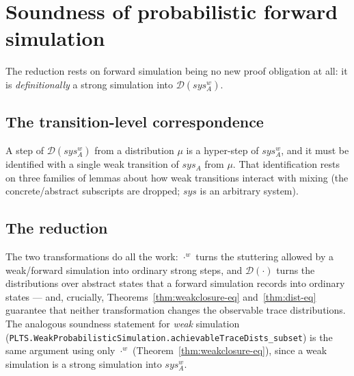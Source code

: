 

\section{Soundness of probabilistic forward simulation}

The reduction rests on forward simulation being no new proof obligation at all: it is \emph{definitionally} a strong simulation into $\mathcal{D}(sys_A^w)$.

\subsection{The transition-level correspondence}

A step of $\mathcal{D}(sys_A^w)$ from a distribution $\mu$ is a hyper-step of $sys_A^w$, and it must be identified with a single weak transition of $sys_A$ from $\mu$.
That identification rests on three families of lemmas about how weak transitions interact with mixing (the concrete/abstract subscripts are dropped; $sys$ is an arbitrary system).









\subsection{The reduction}





The two transformations do all the work: $\cdot^w$ turns the stuttering allowed by a weak/forward simulation into ordinary strong steps, and $\mathcal{D}(\cdot)$ turns the distributions over abstract states that a forward simulation records into ordinary states --- and, crucially, Theorems~\ref{thm:weakclosure-eq} and~\ref{thm:dist-eq} guarantee that neither transformation changes the observable trace distributions.
The analogous soundness statement for \emph{weak} simulation
(\texttt{PLTS.WeakProbabilisticSimulation.achievableTraceDists\_subset}) is the same argument using only $\cdot^w$ (Theorem~\ref{thm:weakclosure-eq}), since a weak simulation is a strong simulation into $sys_A^w$.

